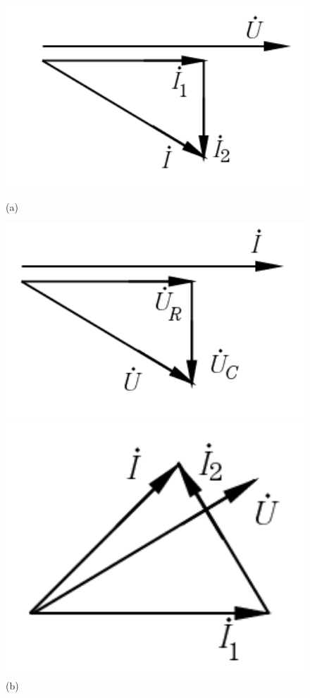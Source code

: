 \documentclass[hyperref, UTF8]{ctexart}
\begin{document}
\begin{figure}[!htb]
\centering
\begin{minipage}[t]{0.201\textwidth}
\centering
\includegraphics[width=1\textwidth]{p11-5-a-sol.png}
\caption*{(a)}
\end{minipage}
\begin{minipage}[t]{0.191\textwidth}
\centering
\includegraphics[width=1\textwidth]{p11-5-b-sol.png}
\caption*{(b)}
\end{minipage}
\begin{minipage}[t]{0.144\textwidth}
\centering
\includegraphics[width=1\textwidth]{p11-5-c-sol.png}

\end{minipage}
\end{figure}
\end{document}
